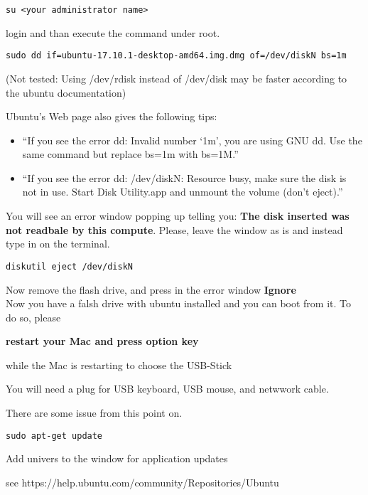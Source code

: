 \begin{verbatim}
su <your administrator name>
\end{verbatim}

login and than execute the command under root.

\begin{verbatim}
sudo dd if=ubuntu-17.10.1-desktop-amd64.img.dmg of=/dev/diskN bs=1m
\end{verbatim}

(Not tested: Using /dev/rdisk instead of /dev/disk may be faster
according to the ubuntu documentation)

Ubuntu's Web page also gives the following tips:

\begin{itemize}
\tightlist
\item
  ``If you see the error dd: Invalid number `1m', you are using GNU dd.
  Use the same command but replace bs=1m with bs=1M.''
\item
  ``If you see the error dd: /dev/diskN: Resource busy, make sure the
  disk is not in use. Start Disk Utility.app and unmount the volume
  (don't eject).''
\end{itemize}

You will see an error window popping up telling you: \textbf{The disk
inserted was not readbale by this compute}. Please, leave the window as
is and instead type in on the terminal.

\begin{verbatim}
diskutil eject /dev/diskN
\end{verbatim}

Now remove the flash drive, and press in the error window
\textbf{Ignore}\\
Now you have a falsh drive with ubuntu installed and you can boot from
it. To do so, please

\textbf{restart your Mac and press option key}

while the Mac is restarting to choose the USB-Stick

You will need a plug for USB keyboard, USB mouse, and netwwork cable.

There are some issue from this point on.

\begin{verbatim}
sudo apt-get update
\end{verbatim}

Add univers to the window for application updates

see https://help.ubuntu.com/community/Repositories/Ubuntu

